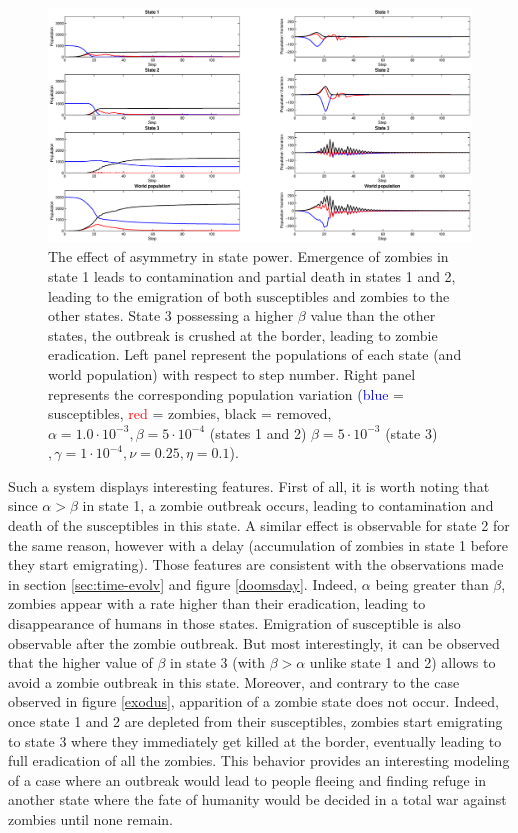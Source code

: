 \documentclass[11pt]{article} %
\begin{document}
\begin{figure}[h!]
\centerline{
\includegraphics[scale=0.35]{../images/Matlab_figures/asymmetric-system.eps}}
\caption{The effect of asymmetry in state power.  Emergence of zombies in state 1 leads to contamination and partial death in states 1 and 2, leading to the emigration of both susceptibles and zombies to the other states.  State 3 possessing a higher $\beta$ value than the other states, the outbreak is crushed at the border, leading to zombie eradication. Left panel represent the populations of each state (and world population) with respect to step number. Right panel represents the corresponding population variation (\textcolor{blue}{blue} = susceptibles, \textcolor{red}{red} = zombies, black = removed, $\alpha=1.0\cdot10^{-3}, \beta=5\cdot10^{-4} $ (states 1 and 2) $\beta=5\cdot10^{-3}$ (state 3) $, \gamma=1\cdot10^{-4}, \nu=0.25, \eta=0.1$). \label{basym} }
\end{figure}

Such a system displays interesting features. First of all, it is worth noting that since $\alpha>\beta$ in state 1, a zombie outbreak occurs, leading to contamination and death of the susceptibles in this state. A similar effect is observable for state 2 for the same reason, however with a delay (accumulation of zombies in state 1 before they start emigrating). Those features are consistent with the observations made in section \ref{sec:time-evolv} and figure \ref{doomsday}. Indeed, $\alpha$ being greater than $\beta$, zombies appear with a rate higher than their eradication, leading to disappearance of humans in those states. Emigration of susceptible is also observable after the zombie outbreak. But most interestingly, it can be observed that the higher value of $\beta$ in state 3 (with $\beta>\alpha$ unlike state 1 and 2) allows to avoid a zombie outbreak in this state. Moreover, and contrary to the case observed in figure \ref{exodus}, apparition of a zombie state does not occur. Indeed, once state 1 and 2 are depleted from their susceptibles, zombies start emigrating to state 3 where they immediately get killed at the border, eventually leading to full eradication of all the zombies. This behavior provides an interesting modeling of a case where an outbreak would lead to people fleeing and finding refuge in another state where the fate of humanity would be decided in a total war against zombies until none remain.
\end{document}
